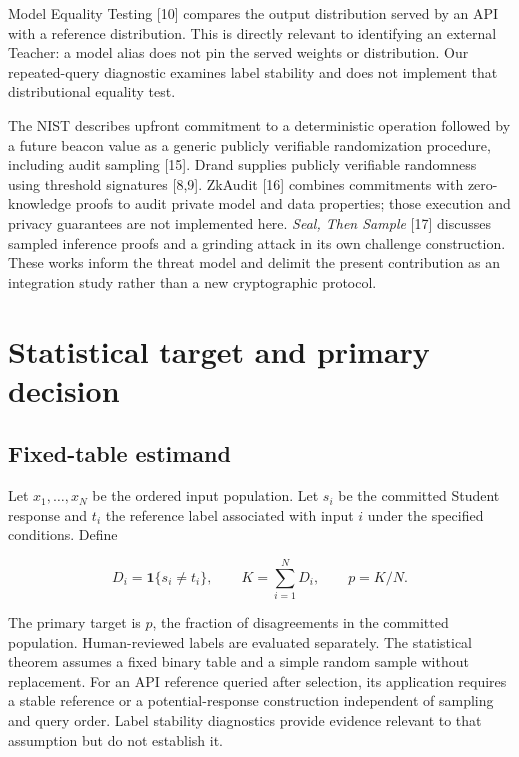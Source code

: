 \documentclass[
  10pt,
]{article}
\let\oldsection\section
\renewcommand{\section}{\needspace{5\baselineskip}\oldsection}
\begin{document}
Model Equality Testing {[}10{]} compares the output distribution served
by an API with a reference distribution. This is directly relevant to
identifying an external Teacher: a model alias does not pin the served
weights or distribution. Our repeated-query diagnostic examines label
stability and does not implement that distributional equality test.

The NIST describes upfront commitment to a deterministic operation
followed by a future beacon value as a generic publicly verifiable
randomization procedure, including audit sampling {[}15{]}. Drand
supplies publicly verifiable randomness using threshold signatures
{[}8,9{]}. ZkAudit {[}16{]} combines commitments with zero-knowledge
proofs to audit private model and data properties; those execution and
privacy guarantees are not implemented here. \emph{Seal, Then Sample}
{[}17{]} discusses sampled inference proofs and a grinding attack in its
own challenge construction. These works inform the threat model and
delimit the present contribution as an integration study rather than a
new cryptographic protocol.

\hypertarget{statistical-target-and-primary-decision}{%
\section{Statistical target and primary
decision}\label{statistical-target-and-primary-decision}}

\hypertarget{fixed-table-estimand}{%
\subsection{Fixed-table estimand}\label{fixed-table-estimand}}

Let \(x_1,\ldots,x_N\) be the ordered input population. Let \(s_i\) be
the committed Student response and \(t_i\) the reference label
associated with input \(i\) under the specified conditions. Define

\[
D_i=\mathbf{1}\{s_i\ne t_i\},\qquad K=\sum_{i=1}^{N}D_i,\qquad p=K/N.
\]

The primary target is \(p\), the fraction of disagreements in the
committed population. Human-reviewed labels are evaluated separately.
The statistical theorem assumes a fixed binary table and a simple random
sample without replacement. For an API reference queried after
selection, its application requires a stable reference or a
potential-response construction independent of sampling and query order.
Label stability diagnostics provide evidence relevant to that assumption
but do not establish it.
\end{document}
